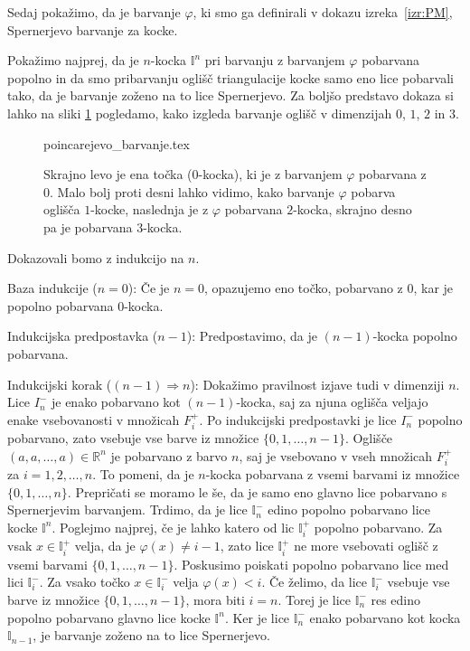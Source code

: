 \documentclass[mat1]{fmfdelo}
\newcommand{\R}{\mathbb R}
\newcommand{\I}{\mathbb I}
\newcommand{\0}{0}
\begin{document}
Sedaj pokažimo, da je barvanje $\varphi$, ki smo ga definirali v dokazu izreka~\ref{izr:PM}, Spernerjevo barvanje za kocke.
\begin{dokaz}
Pokažimo najprej, da je $n$-kocka $\I^n$ pri barvanju z barvanjem $\varphi$ pobarvana popolno in da smo pribarvanju oglišč triangulacije kocke samo eno lice pobarvali tako, da je barvanje zoženo na to lice Spernerjevo. Za boljšo predstavo dokaza si lahko na sliki \ref{fig:PMcolor} pogledamo, kako izgleda barvanje oglišč v dimenzijah $0$, $1$, $2$ in $3$.
\begin{figure}[h!]
	\centering
	{poincarejevo_barvanje.tex}
	\caption{Skrajno levo je ena točka ($0$-kocka), ki je z barvanjem $\varphi$ pobarvana z $0$. Malo bolj proti desni lahko vidimo, kako barvanje $\varphi$ pobarva oglišča $1$-kocke, naslednja je z $\varphi$ pobarvana $2$-kocka, skrajno desno pa je pobarvana $3$-kocka.}\label{fig:PMcolor}
\end{figure}
Dokazovali bomo z indukcijo na $n$.

Baza indukcije ($n = 0$):
Če je $n=0$, opazujemo eno točko, pobarvano z $0$, kar je popolno pobarvana $0$-kocka.

Indukcijska predpostavka ($n - 1$):
Predpostavimo, da je $(n - 1)$-kocka popolno pobarvana.

Indukcijski korak ($(n - 1) \Longrightarrow n$):
Dokažimo pravilnost izjave tudi v dimenziji $n$. Lice $I_n^-$ je enako pobarvano kot $(n-1)$-kocka, saj za njuna oglišča veljajo enake vsebovanosti v množicah $F_i^+$. Po indukcijski predpostavki je lice $I_n^-$ popolno pobarvano, zato vsebuje vse barve iz množice $\{ 0, 1, \dots, n-1\}$. Oglišče $(a, a, \dots, a) \in \R^n$ je pobarvano z barvo $n$, saj je vsebovano v vseh množicah $F_i^+$ za $i = 1, 2, \dots, n$. To pomeni, da je $n$-kocka pobarvana z vsemi barvami iz množice $\{ 0, 1, \dots, n \}$. Prepričati se moramo le še, da je samo eno glavno lice pobarvano s Spernerjevim barvanjem. 
Trdimo, da je lice $\I_n^-$ edino popolno pobarvano lice kocke $\I^n$. Poglejmo najprej, če je lahko katero od lic $\I_i^+$ popolno pobarvano. Za vsak $x \in \I_i^+$ velja, da je $\varphi (x) \neq i-1$, zato lice $\I_i^+$ ne more vsebovati oglišč z vsemi barvami $\{ 0, 1, \dots, n - 1 \}$. Poskusimo poiskati popolno pobarvano lice med lici $\I_i^-$. Za vsako točko $x \in \I_i^-$ velja $\varphi (x) < i$. Če želimo, da lice $\I_i^-$ vsebuje vse barve iz množice $\{ 0, 1, \dots, n - 1 \}$, mora biti $i = n$. Torej je lice $\I_n^-$ res edino popolno pobarvano glavno lice kocke $\I^n$. Ker je lice $\I_n^-$  enako pobarvano kot kocka $\I_{n-1}$, je barvanje zoženo na to lice Spernerjevo. 


\end{dokaz}
\end{document}
